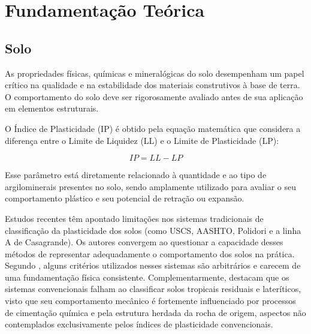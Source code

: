 \newpage

\chapter{Fundamentação Teórica}

\section{Solo}


As propriedades físicas, químicas e mineralógicas do solo desempenham um papel crítico na qualidade e na estabilidade dos materiais construtivos à base de terra. O comportamento do solo deve ser rigorosamente avaliado antes de sua aplicação em elementos estruturais. 

O Índice de Plasticidade (IP) é obtido pela equação matemática que considera a diferença entre o Limite de Liquidez (LL) e o Limite de Plasticidade (LP):

\begin{equation}
    IP = LL - LP
    \label{eq:indice-de-plasticidade}
\end{equation}

Esse parâmetro está diretamente relacionado à quantidade e ao tipo de argilominerais presentes no solo, sendo amplamente utilizado para avaliar o seu comportamento plástico e seu potencial de retração ou expansão. 

Estudos recentes têm apontado limitações nos sistemas tradicionais de classificação da plasticidade dos solos (como USCS, AASHTO, Polidori e a linha A de Casagrande). Os autores convergem ao questionar a capacidade desses métodos de representar adequadamente o comportamento dos solos na prática. Segundo , alguns critérios utilizados nesses sistemas são arbitrários e carecem de uma fundamentação física consistente. Complementarmente,  destacam que os sistemas convencionais falham ao classificar solos tropicais residuais e lateríticos, visto que seu comportamento mecânico é fortemente influenciado por processos de cimentação química e pela estrutura herdada da rocha de origem, aspectos não contemplados exclusivamente pelos índices de plasticidade convencionais.

